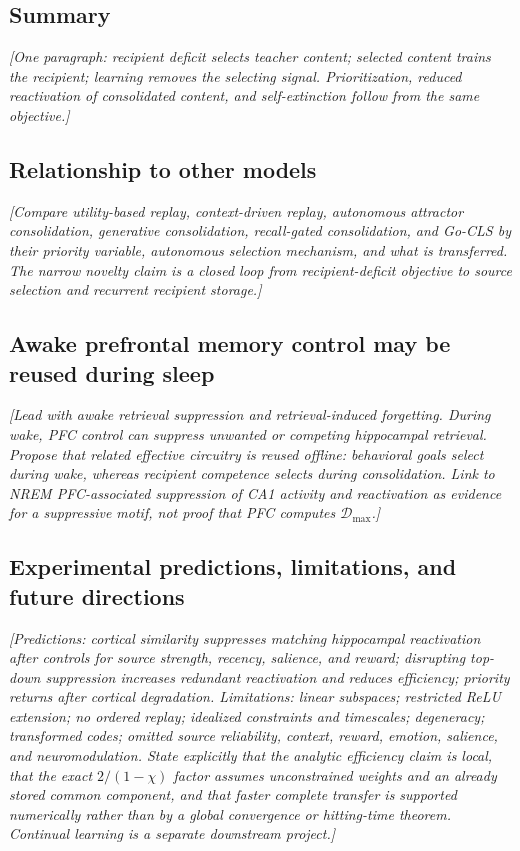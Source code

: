 \documentclass[10pt,letterpaper]{article}
\theoremstyle{plain}
\theoremstyle{remark}
\begin{document}
\subsection{Summary}
\textit{[One paragraph: recipient deficit selects teacher content; selected content trains the recipient; learning removes the selecting signal. Prioritization, reduced reactivation of consolidated content, and self-extinction follow from the same objective.]}

\subsection{Relationship to other models}
\textit{[Compare utility-based replay, context-driven replay, autonomous attractor consolidation, generative consolidation, recall-gated consolidation, and Go-CLS by their priority variable, autonomous selection mechanism, and what is transferred. The narrow novelty claim is a closed loop from recipient-deficit objective to source selection and recurrent recipient storage.]}

\subsection{Awake prefrontal memory control may be reused during sleep}
\textit{[Lead with awake retrieval suppression and retrieval-induced forgetting. During wake, PFC control can suppress unwanted or competing hippocampal retrieval. Propose that related effective circuitry is reused offline: behavioral goals select during wake, whereas recipient competence selects during consolidation. Link to NREM PFC-associated suppression of CA1 activity and reactivation as evidence for a suppressive motif, not proof that PFC computes $\mathcal D_{\max}$.]}

\subsection{Experimental predictions, limitations, and future directions}
\textit{[Predictions: cortical similarity suppresses matching hippocampal reactivation after controls for source strength, recency, salience, and reward; disrupting top-down suppression increases redundant reactivation and reduces efficiency; priority returns after cortical degradation. Limitations: linear subspaces; restricted ReLU extension; no ordered replay; idealized constraints and timescales; degeneracy; transformed codes; omitted source reliability, context, reward, emotion, salience, and neuromodulation. State explicitly that the analytic efficiency claim is local, that the exact $2/(1-\chi)$ factor assumes unconstrained weights and an already stored common component, and that faster complete transfer is supported numerically rather than by a global convergence or hitting-time theorem. Continual learning is a separate downstream project.]}
\end{document}
